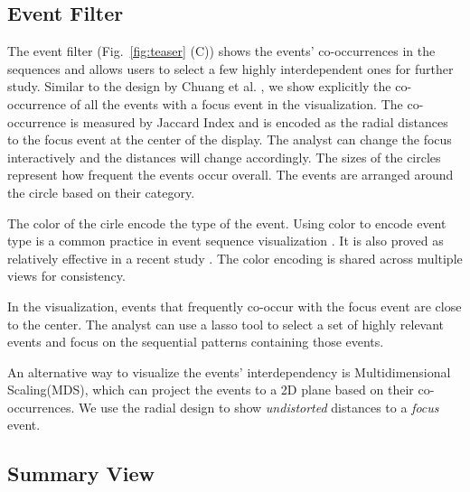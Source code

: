 \subsection{Event Filter}

The event filter (Fig.~\ref{fig:teaser} (C)) shows the events' co-occurrences in the sequences and allows users to select a few highly interdependent ones for further study. Similar to the design by Chuang et al. \cite{Chuang2012}, we show explicitly the co-occurrence of all the events with a focus event in the visualization. The co-occurrence is measured by Jaccard Index and is encoded as the radial distances to the focus event at the center of the display. The analyst can change the focus interactively and the distances will change accordingly. The sizes of the circles represent how frequent the events occur overall. The events are arranged around the circle based on their category.  

The color of the cirle encode the type of the event. Using color to encode event type is a common practice in event sequence visualization \cite{monroe2013temporal, liu2017patterns}. It is also proved as relatively effective in a recent study \cite{ruddle2016methods}. The color encoding is shared across multiple views for consistency. 

In the visualization, events that frequently co-occur with the focus event are close to the center. The analyst can use a lasso tool to select a set of highly relevant events and focus on the sequential patterns containing those events.

An alternative way to visualize the events' interdependency is Multidimensional Scaling(MDS), which can project the events to a 2D plane based on their co-occurrences. We use the radial design to show \textit{undistorted} distances to a \textit{focus} event. 

\subsection{Summary View}

